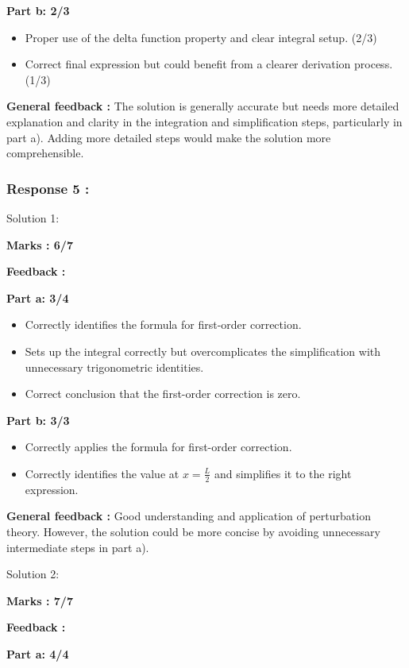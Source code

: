 \documentclass[a4paper,11pt]{article}
\begin{document}
\textbf{Part b: 2/3}
\begin{itemize}
    \item Proper use of the delta function property and clear integral setup. (2/3)
    \item Correct final expression but could benefit from a clearer derivation process. (1/3)
\end{itemize}

\textbf{General feedback :}
The solution is generally accurate but needs more detailed explanation and clarity in the integration and simplification steps, particularly in part a). Adding more detailed steps would make the solution more comprehensible.


\subsubsection*{Response 5 :}

Solution 1:


\textbf{ Marks : 6/7}

\textbf{Feedback :}

\textbf{Part a: 3/4}

\begin{itemize}
    \item Correctly identifies the formula for first-order correction.
    \item Sets up the integral correctly but overcomplicates the simplification with unnecessary trigonometric identities.
    \item Correct conclusion that the first-order correction is zero.
\end{itemize}

\textbf{Part b: 3/3}
\begin{itemize}
    \item Correctly applies the formula for first-order correction.
    \item Correctly identifies the value at $x = \frac{L}{2}$ and simplifies it to the right expression.
\end{itemize}

\textbf{General feedback :}
Good understanding and application of perturbation theory. However, the solution could be more concise by avoiding unnecessary intermediate steps in part a).


Solution 2:


\textbf{ Marks : 7/7}

\textbf{Feedback :}

\textbf{Part a: 4/4}
\end{document}
